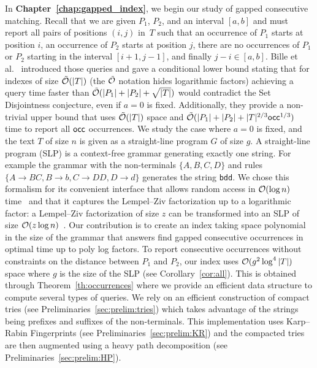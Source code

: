 In \textbf{Chapter~\ref{chap:gapped_index}}, we begin our study of gapped consecutive matching. Recall that we are given $P_1$, $P_2$, and an interval $[a,b]$ and must report all pairs of positions $(i,j)$ in~$T$ such that an occurrence of $P_1$ starts at position $i$, an occurrence of $P_2$ starts at position $j$, there are no occurrences of $P_1$ or $P_2$ starting in the interval $[i+1,j-1]$, and finally $j-i \in [a,b]$.
Bille et al.~\cite{bille2022gapped} introduced those queries and gave a conditional lower bound stating that for indexes of size $\tilde {\mathcal{O}}(|T|)$ (the $\tilde {\mathcal{O}}$ notation hides logarithmic factors) achieving a query time faster than $\tilde {\mathcal{O}}(|P_1|+|P_2|+\sqrt{|T|})$ would contradict the Set Disjointness conjecture, even if $a=0$ is fixed. Additionally, they provide a non-trivial upper bound that uses $\tilde {\mathcal{O}}(|T|)$ space and $\tilde {\mathcal{O}} (|P_1| +|P_2| + |T|^{2/3}\mathsf{occ}^{1/3})$ time to report all $\mathsf{occ}$ occurrences. 
We study the case where $a=0$ is fixed, and the text $T$ of size $n$ is given as a straight-line program $G$ of size $g$. A straight-line program (SLP) is a context-free grammar generating exactly one string. For example the grammar with the non-terminals $\{A,B,C,D\}$ and rules $\{A \rightarrow BC, B \rightarrow b, C \rightarrow DD, D\rightarrow d \}$ generates the string \texttt{bdd}.
We chose this formalism for its convenient interface that allows random access in $\mathcal{O}(\log n)$ time~\cite{random_access_grammar_compress} and that it captures the  Lempel--Ziv factorization up to a logarithmic factor: a Lempel--Ziv factorization of size $z$ can be transformed into an SLP of size $\mathcal{O}(z\log n)$~\cite{CharikarLLPPRSS02,Rytter02}.
%
Our contribution is to create an index taking space polynomial in the size of the grammar that answers find gapped consecutive occurrences in optimal time up to poly log factors.
To report consecutive occurrences without constraints on the distance between $P_1$ and $P_2$, our index uses $\mathcal{O}(g^2\log^4|T|)$ space where $g$ is the size of the SLP (see Corollary~\ref{cor:all}).
This is obtained through Theorem~\ref{th:occurrences} where we provide an efficient data structure to compute several types of queries. We rely on an efficient construction of compact tries (see Preliminaries~\ref{sec:prelim:tries}) which takes advantage of the strings being prefixes and suffixes of the non-terminals. This implementation uses Karp--Rabin Fingerprints (see Preliminaries~\ref{sec:prelim:KR}) and the compacted tries are then augmented using a heavy path decomposition (see Preliminaries~\ref{sec:prelim:HP}).
